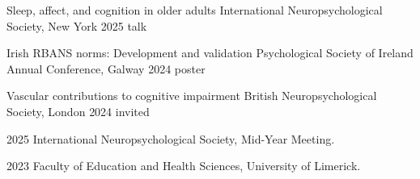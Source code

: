 \documentclass[palette=slate, layout=onecol]{rosscv}
\begin{document}
\conferenceentry
  {Sleep, affect, and cognition in older adults}
  {International Neuropsychological Society, New York}
  {2025}
  {talk}

\conferenceentry
  {Irish RBANS norms: Development and validation}
  {Psychological Society of Ireland Annual Conference, Galway}
  {2024}
  {poster}

\conferenceentry
  {Vascular contributions to cognitive impairment}
  {British Neuropsychological Society, London}
  {2024}
  {invited}


  {2025}
  {International Neuropsychological Society, Mid-Year Meeting.}

  {2023}
  {Faculty of Education and Health Sciences, University of Limerick.}


\end{document}
